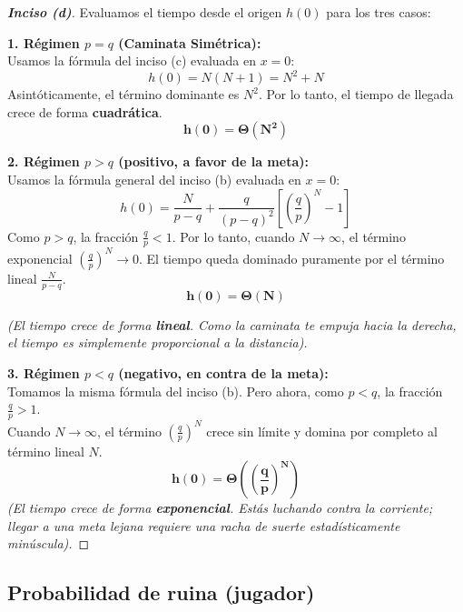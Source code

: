 \documentclass[10pt,a4paper]{article}
\begin{document}
\begin{proof}[\textbf{Inciso (d)}]

    \vspace{2mm}

    Evaluamos el tiempo desde el origen $h(0)$ para los tres casos:

    \vspace{2mm}

    \textbf{1. Régimen $p = q$ (Caminata Simétrica):} \\
    Usamos la fórmula del inciso (c) evaluada en $x=0$:
    \[ h(0) = N(N+1) = N^2 + N \]
    Asintóticamente, el término dominante es $N^2$. Por lo tanto, el tiempo de llegada crece de forma \textbf{cuadrática}.
    \[ \mathbf{h(0) = \Theta(N^2)} \]

    \textbf{2. Régimen $p > q$ (positivo, a favor de la meta):} \\
    Usamos la fórmula general del inciso (b) evaluada en $x=0$:
    \[ h(0) = \frac{N}{p-q} + \frac{q}{(p-q)^2} \left[ \left(\frac{q}{p}\right)^N - 1 \right] \]
    Como $p > q$, la fracción $\frac{q}{p} < 1$. Por lo tanto, cuando $N \to \infty$, el término exponencial $(\frac{q}{p})^N \to 0$. El tiempo queda dominado puramente por el término lineal $\frac{N}{p-q}$.
    \[ \mathbf{h(0) = \Theta(N)} \]

    \vspace{2mm}

    \textit{(El tiempo crece de forma \textbf{lineal}. Como la caminata te empuja hacia la derecha, el tiempo es simplemente proporcional a la distancia).}

    \vspace{2mm}

    \textbf{3. Régimen $p < q$ (negativo, en contra de la meta):} \\
    Tomamos la misma fórmula del inciso (b). Pero ahora, como $p < q$, la fracción $\frac{q}{p} > 1$. \\
    Cuando $N \to \infty$, el término $(\frac{q}{p})^N$ crece sin límite y domina por completo al término lineal $N$.
    \[ \mathbf{h(0) = \Theta\left( \left(\frac{q}{p}\right)^N \right)} \]
    \textit{(El tiempo crece de forma \textbf{exponencial}. Estás luchando contra la corriente; llegar a una meta lejana requiere una racha de suerte estadísticamente minúscula).}
\end{proof}

\newpage

\subsection{Probabilidad de ruina (jugador)}
\end{document}
